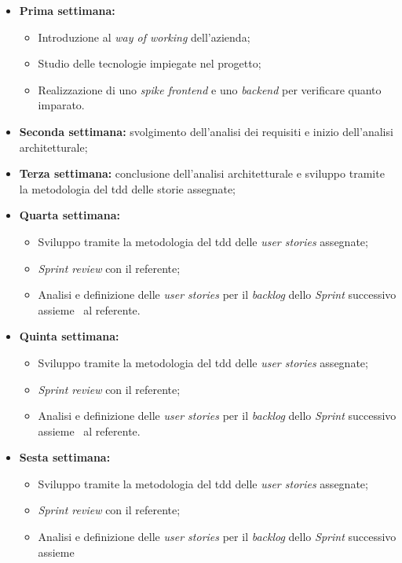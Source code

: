 \begin{itemize}
  \item \textbf{Prima settimana:} 
    \begin{itemize}
      \item Introduzione al \emph{way of working} dell'azienda;
      \item Studio delle tecnologie impiegate nel progetto;
      \item Realizzazione di uno \emph{spike \gls{frontend}} e uno \emph{\gls{backend}} per verificare quanto imparato.
    \end{itemize}
  \item \textbf{Seconda settimana:} svolgimento dell'analisi dei requisiti e inizio dell'analisi architetturale;
  \item \textbf{Terza settimana:} conclusione dell'analisi architetturale e sviluppo tramite la metodologia del \acrshort{tdd} delle storie assegnate;
  \item \textbf{Quarta settimana:} 
    \begin{itemize}
      \item Sviluppo tramite la metodologia del \acrshort{tdd} delle \emph{user stories} assegnate;
      \item \emph{Sprint review} con il referente;
      \item Analisi e definizione delle \emph{user stories} per il \emph{backlog} dello \emph{Sprint} successivo assieme \
      al referente.
    \end{itemize}
  \item \textbf{Quinta settimana:} 
    \begin{itemize}
      \item Sviluppo tramite la metodologia del \acrshort{tdd} delle \emph{user stories} assegnate;
      \item \emph{Sprint review} con il referente;
      \item Analisi e definizione delle \emph{user stories} per il \emph{backlog} dello \emph{Sprint} successivo assieme \
      al referente.
    \end{itemize}
  \item \textbf{Sesta settimana:} 
    \begin{itemize}
      \item Sviluppo tramite la metodologia del \acrshort{tdd} delle \emph{user stories} assegnate;
      \item \emph{Sprint review} con il referente;
      \item Analisi e definizione delle \emph{user stories} per il \emph{backlog} dello \emph{Sprint} successivo assieme \

\end{itemize}
\end{itemize}
